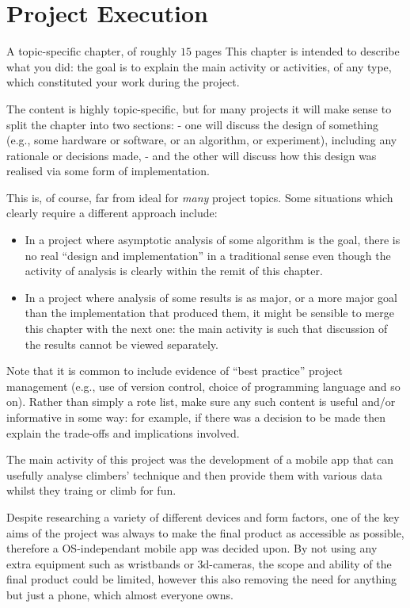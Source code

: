 \chapter{Project Execution}
\label{chap:execution}

A topic-specific chapter, of roughly $15$ pages
This chapter is intended to describe what you did: the goal is to explain the main activity or activities, of any type, which constituted your work during the project.

The content is highly topic-specific, but for many projects it will make sense to split the chapter into two sections:
 - one will discuss the design of something (e.g., some hardware or software, or an algorithm, or experiment), including any rationale or decisions made,
 - and the other will discuss how this design was realised via some form of implementation.

This is, of course, far from ideal for {\em many} project topics.  Some
situations which clearly require a different approach include:
\begin{itemize}
\item In a project where asymptotic analysis of some algorithm is the goal,
      there is no real ``design and implementation'' in a traditional sense
      even though the activity of analysis is clearly within the remit of
      this chapter.
\item In a project where analysis of some results is as major, or a more
      major goal than the implementation that produced them, it might be
      sensible to merge this chapter with the next one: the main activity
      is such that discussion of the results cannot be viewed separately.
\end{itemize}


Note that it is common to include evidence of ``best practice'' project management (e.g., use of version control, choice of programming language and so on).
Rather than simply a rote list, make sure any such content is useful and/or informative in some way: for example, if there was a decision to be made then explain the trade-offs and implications involved.




The main activity of this project was the development of a mobile app that can usefully analyse climbers' technique and then provide them with various data whilst they traing or climb for fun.

Despite researching a variety of different devices and form factors, one of the key aims of the project was always to make the final product as accessible as possible, therefore a OS-independant mobile app was decided upon.
By not using any extra equipment such as wristbands or 3d-cameras, the scope and ability of the final product could be limited, however this also removing the need for anything but just a phone, which almost everyone owns.


